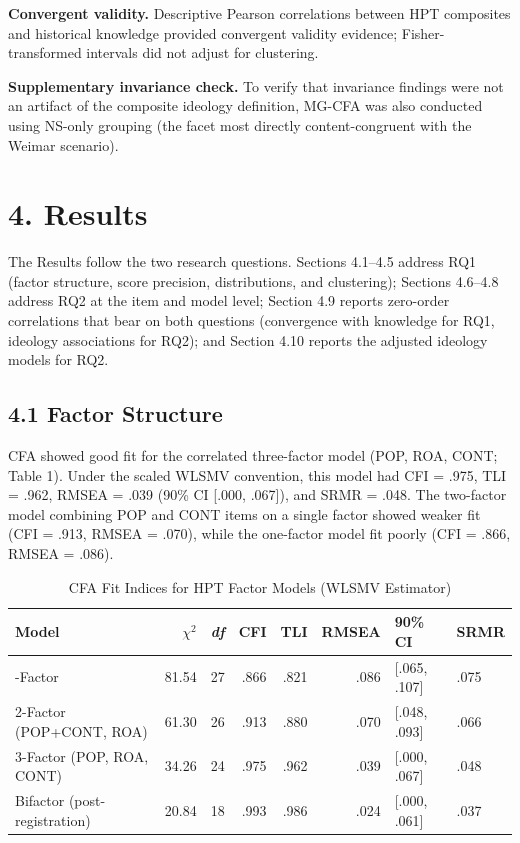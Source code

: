 \documentclass[PCJ,Unicode,screen,mode=plain]{cedram}
\begin{document}
\textbf{Convergent validity.} Descriptive Pearson correlations between HPT composites and historical knowledge provided convergent validity evidence; Fisher-transformed intervals did not adjust for clustering.

\textbf{Supplementary invariance check.} To verify that invariance findings were not an artifact of the composite ideology definition, MG-CFA was also conducted using NS-only grouping (the facet most directly content-congruent with the Weimar scenario).

\section*{4. Results}\label{results}

The Results follow the two research questions. Sections 4.1--4.5 address
RQ1 (factor structure, score precision, distributions, and clustering);
Sections 4.6--4.8 address RQ2 at the item and model level; Section 4.9 reports
zero-order correlations that bear on both questions (convergence with
knowledge for RQ1, ideology associations for RQ2); and Section 4.10 reports the
adjusted ideology models for RQ2.

\subsection*{4.1 Factor Structure}\label{factor-structure}

CFA showed good fit for the correlated three-factor model (POP, ROA, CONT;
Table 1). Under the scaled WLSMV convention, this model had CFI = .975,
TLI = .962, RMSEA = .039 (90\% CI [.000, .067]), and SRMR = .048. The
two-factor model combining POP and CONT items on a single factor showed weaker
fit (CFI = .913, RMSEA = .070), while the one-factor model fit poorly
(CFI = .866, RMSEA = .086).

\begin{longtable}[]{@{}lrrrrrll@{}}
\caption{CFA Fit Indices for HPT Factor Models (WLSMV Estimator)}\label{tab:1}\\
\toprule
Model & \(\chi^2\) & \emph{df} & CFI & TLI & RMSEA & 90\% CI & SRMR \\
\midrule
\endhead
\bottomrule
\endlastfoot
1-Factor & 81.54 & 27 & .866 & .821 & .086 & [.065, .107] & .075 \\
2-Factor (POP+CONT, ROA) & 61.30 & 26 & .913 & .880 & .070 & [.048, .093] & .066 \\
3-Factor (POP, ROA, CONT) & 34.26 & 24 & .975 & .962 & .039 & [.000, .067] & .048 \\
Bifactor (post-registration) & 20.84 & 18 & .993 & .986 & .024 & [.000, .061] & .037 \\
\end{longtable}
\end{document}
